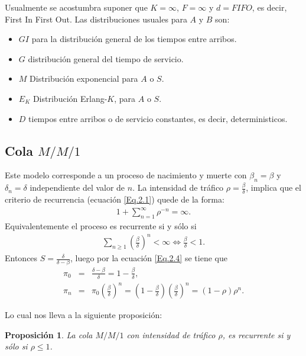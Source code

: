 \documentclass{article}
\newtheorem{Prop}{Proposición}
\begin{document}
Usualmente se acostumbra suponer que $K=\infty$, $F=\infty$ y $d=FIFO$, es decir, First In First Out. Las distribuciones usuales para $A$ y $B$ son:

\begin{itemize}
\item $GI$ para la distribuci\'on general de los tiempos entre arribos.
\item $G$ distribuci\'on general del tiempo de servicio.
\item $M$ Distribuci\'on exponencial para $A$ o $S$.
\item $E_{K}$ Distribuci\'on Erlang-$K$, para $A$ o $S$.
\item $D$ tiempos entre arribos o de servicio constantes, es decir, deterministicos.
\end{itemize}


%
\subsection{Cola $M/M/1$}
%
Este modelo corresponde a un proceso de nacimiento y muerte con $\beta_{n}=\beta$ y $\delta_{n}=\delta$ independiente del valor de $n$. La intensidad de tr\'afico $\rho=\frac{\beta}{\delta}$, implica que el criterio de recurrencia (ecuaci\'on \ref{Eq.2.1}) quede de la forma:
\begin{eqnarray*}
1+\sum_{n=1}^{\infty}\rho^{-n}=\infty.
\end{eqnarray*}
Equivalentemente el proceso es recurrente si y s\'olo si
\begin{eqnarray*}
\sum_{n\geq1}\left(\frac{\beta}{\delta}\right)^{n}<\infty\Leftrightarrow \frac{\beta}{\delta}<1.
\end{eqnarray*}
Entonces
$S=\frac{\delta}{\delta-\beta}$, luego por la ecuaci\'on \ref{Eq.2.4} se tiene que
\begin{eqnarray*}
\pi_{0}&=&\frac{\delta-\beta}{\delta}=1-\frac{\beta}{\delta},\\
\pi_{n}&=&\pi_{0}\left(\frac{\beta}{\delta}\right)^{n}=\left(1-\frac{\beta}{\delta}\right)\left(\frac{\beta}{\delta}\right)^{n}=\left(1-\rho\right)\rho^{n}.
\end{eqnarray*}


Lo cual nos lleva a la siguiente proposici\'on:

\begin{Prop}
La cola $M/M/1$ con intensidad de tr\'afico $\rho$, es recurrente si y s\'olo si $\rho\leq1$.
\end{Prop}
\end{document}
